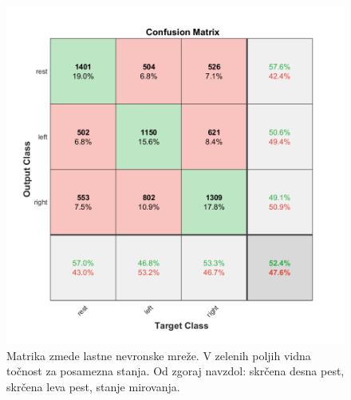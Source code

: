 \begin{figure}
\begin{center}
\includegraphics[width=0.8\linewidth]{slike/Confusion_13-20Hz_0s-4s.png}
\end{center}
\caption{Matrika zmede lastne nevronske mreže. V zelenih poljih vidna točnost za posamezna stanja. Od zgoraj navzdol: skrčena desna pest, skrčena leva pest, stanje mirovanja.}
\label{slika:nevronska_mreza_matrika}
\end{figure}



